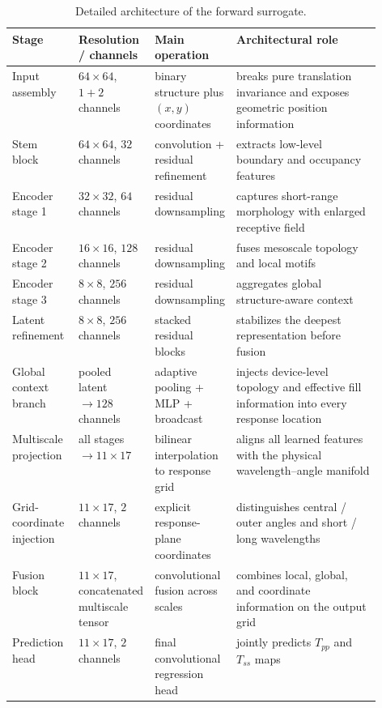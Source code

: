 \documentclass[10pt,a4paper]{article}
\newcommand{\tp}{T_{pp}}
\newcommand{\ts}{T_{ss}}
\begin{document}
\begin{table}[!htbp]
\centering
\caption{Detailed architecture of the forward surrogate.}
\begin{tabularx}{\linewidth}{>{\raggedright\arraybackslash}p{0.18\linewidth}>{\raggedright\arraybackslash}p{0.18\linewidth}>{\raggedright\arraybackslash}p{0.17\linewidth}X}
\toprule
Stage & Resolution / channels & Main operation & Architectural role \\
\midrule
Input assembly & $64\times64$, $1+2$ channels & binary structure plus $(x,y)$ coordinates & breaks pure translation invariance and exposes geometric position information \\
Stem block & $64\times64$, $32$ channels & convolution + residual refinement & extracts low-level boundary and occupancy features \\
Encoder stage 1 & $32\times32$, $64$ channels & residual downsampling & captures short-range morphology with enlarged receptive field \\
Encoder stage 2 & $16\times16$, $128$ channels & residual downsampling & fuses mesoscale topology and local motifs \\
Encoder stage 3 & $8\times8$, $256$ channels & residual downsampling & aggregates global structure-aware context \\
Latent refinement & $8\times8$, $256$ channels & stacked residual blocks & stabilizes the deepest representation before fusion \\
Global context branch & pooled latent $\rightarrow128$ channels & adaptive pooling + MLP + broadcast & injects device-level topology and effective fill information into every response location \\
Multiscale projection & all stages $\rightarrow 11\times17$ & bilinear interpolation to response grid & aligns all learned features with the physical wavelength--angle manifold \\
Grid-coordinate injection & $11\times17$, $2$ channels & explicit response-plane coordinates & distinguishes central / outer angles and short / long wavelengths \\
Fusion block & $11\times17$, concatenated multiscale tensor & convolutional fusion across scales & combines local, global, and coordinate information on the output grid \\
Prediction head & $11\times17$, $2$ channels & final convolutional regression head & jointly predicts $\tp$ and $\ts$ maps \\
\bottomrule
\end{tabularx}
\end{table}
\end{document}
